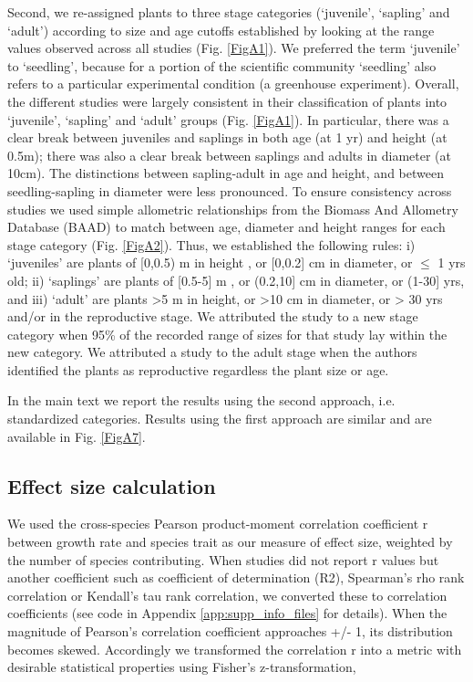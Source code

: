 \documentclass[a4paper]{article}\usepackage[]{graphicx}\usepackage[]{color}
\begin{document}
Second, we re-assigned plants to three stage categories (`juvenile', `sapling' and `adult') according to size and age cutoffs established by looking at the range values observed across all studies (Fig. \ref{FigA1}). We preferred the term `juvenile' to `seedling', because for a portion of the scientific community `seedling' also refers to a particular experimental condition (a greenhouse experiment). Overall, the different studies were largely consistent in their classification of plants into `juvenile', `sapling' and `adult' groups  (Fig. \ref{FigA1}). In particular, there was a clear break between juveniles and saplings in both age (at 1 yr) and height (at 0.5m); there was also a clear break between saplings and adults in diameter (at 10cm). The distinctions between sapling-adult in age and height, and between seedling-sapling in diameter were less pronounced. To ensure consistency across studies we used simple allometric relationships from the Biomass And Allometry Database (BAAD) \citep{Falster:2015} to match between age, diameter and height ranges for each stage category (Fig. \ref{FigA2}). Thus, we established the following rules: i) `juveniles' are plants of {[}0,0.5) m in height , or {[}0,0.2{]} cm in diameter, or $\leq$ 1 yrs old; ii) `saplings' are plants of {[}0.5-5{]} m , or (0.2,10{]} cm in diameter, or (1-30{]} yrs, and iii) `adult' are plants \textgreater{}5 m in height, or \textgreater{}10 cm in diameter, or \textgreater{} 30 yrs and/or in the reproductive stage. We attributed the study to a new stage category when 95\% of the recorded range of sizes for that study lay within the new category. We attributed a study to the adult stage when the authors identified the plants as reproductive regardless the plant size or age. 

In the main text we report the results using the second approach, i.e. standardized categories. Results using the first approach are similar and are available in Fig. \ref{FigA7}.

\subsection*{Effect size calculation}\label{effect-size-calculation}

We used the cross-species Pearson product-moment correlation coefficient r between growth rate and species trait as our measure of effect size, weighted by the number of species contributing. When studies did not report r values but another coefficient such as coefficient of determination (R2), Spearman's rho rank correlation or Kendall's tau rank correlation, we converted these to correlation coefficients  \citep{Lajeunesse:2013tm} (see code in Appendix \ref{app:supp_info_files} for details). When the magnitude of Pearson's correlation coefficient approaches +/- 1, its distribution becomes skewed. Accordingly we transformed the correlation r into a metric with desirable statistical properties using Fisher's z-transformation,
\end{document}
